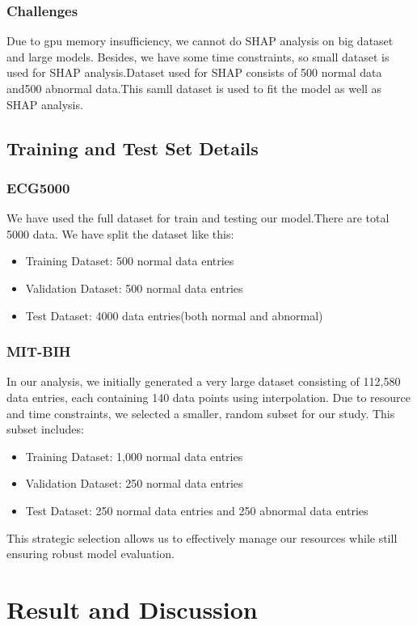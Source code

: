 \documentclass[nonacm,sigconf]{acmart}
\begin{document}
\subsubsection{\textbf{Challenges}}
Due to gpu memory insufficiency, we cannot do SHAP analysis on big dataset and large models. Besides, we have some time constraints, so small dataset is used for SHAP analysis.Dataset used for SHAP consists of 500 normal data and500 abnormal data.This samll dataset is used to fit the model as well as SHAP analysis.




\subsection{Training and Test Set Details}
\subsubsection{\textbf{ECG5000}}
We have used the full dataset for train and testing our model.There are total 5000 data. We have split the dataset like this:
\begin{itemize}
    \item Training Dataset: 500 normal data entries
    \item Validation Dataset: 500 normal data entries
    \item Test Dataset: 4000 data entries(both normal and abnormal)
\end{itemize}
\subsubsection{\textbf{MIT-BIH}}
In our analysis, we initially generated a very large dataset consisting of 112,580 data entries, each containing 140 data points using interpolation. Due to resource and time constraints, we selected a smaller, random subset for our study. This subset includes:
\begin{itemize}
    \item Training Dataset: 1,000 normal data entries
    \item Validation Dataset: 250 normal data entries
    \item Test Dataset: 250 normal data entries and 250 abnormal data entries
\end{itemize}
This strategic selection allows us to effectively manage our resources while still ensuring robust model evaluation.

\section{Result and Discussion}
\end{document}
